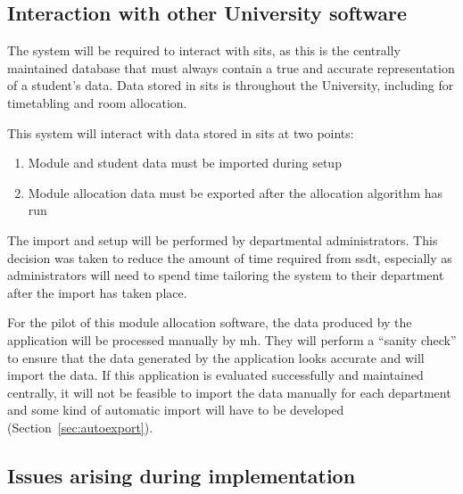 \documentclass[draft]{scrartcl}
\begin{document}

\subsection{Interaction with other University software}

The system will be required to interact with \gls{sits}, as this is the
centrally maintained database that must always contain a true and accurate
representation of a student's data. Data stored in \gls{sits} is throughout
the University, including for timetabling and room allocation.

This system will interact with data stored in \gls{sits} at two points:

\begin{enumerate}
  \item Module and student data must be imported during setup
  \item Module allocation data must be exported after the allocation algorithm has run
\end{enumerate}

The import and setup will be performed by departmental administrators. This
decision was taken to reduce the amount of time required from \gls{ssdt},
especially as administrators will need to spend time tailoring the system to
their department after the import has taken place.

For the pilot of this module allocation software, the data produced by the
application will be processed manually by \gls{mh}. They will
perform a ``sanity check'' to ensure that the data generated by the
application looks accurate and will import the data. If this application is
evaluated successfully and maintained centrally, it will not be feasible to
import the data manually for each department and some kind of automatic import
will have to be developed (Section~\ref{sec:autoexport}).





\subsection{Issues arising during implementation}
\label{sec:issuesarising}
\end{document}
